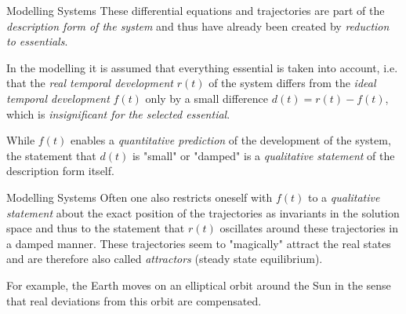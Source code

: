 \documentclass{beamer}
\begin{document}
\begin{frame}{Modelling Systems}
These differential equations and trajectories are part of the
\emph{description form of the system} and thus have already been created by
\emph{reduction to essentials}.

In the modelling it is assumed that everything essential is taken into
account, i.e. that the \emph{real temporal development} $r(t)$ of the system
differs from the \emph{ideal temporal development} $f(t)$ only by a small
difference $d(t)=r(t)-f(t)$, which is \emph{insignificant for the selected
  essential}.

While $f(t)$ enables a \emph{quantitative prediction} of the development of
the system, the statement that $d(t)$ is "small" or "damped" is a
\emph{qualitative statement} of the description form itself.

\end{frame}

\begin{frame}{Modelling Systems}
Often one also restricts oneself with $f(t)$ to a \emph{qualitative statement}
about the exact position of the trajectories as invariants in the solution
space and thus to the statement that $r(t)$ oscillates around these
trajectories in a damped manner.  These trajectories seem to "magically"
attract the real states and are therefore also called \emph{attractors}
(steady state equilibrium).

For example, the Earth moves on an elliptical orbit around the Sun in the
sense that real deviations from this orbit are compensated.

\end{frame}
\end{document}
